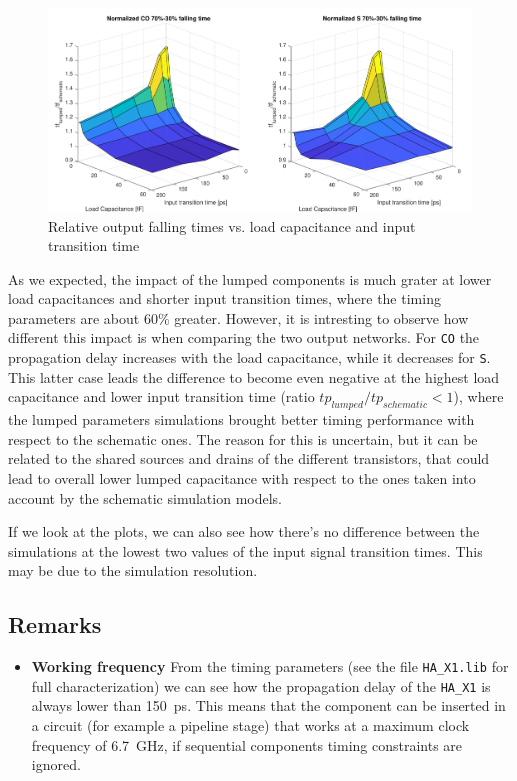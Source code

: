 \documentclass[a4paper]{article}
\newcommand{\ha}{\texttt{HA\_X1}\xspace}
\begin{document}
\begin{figure}[ht]
	\includegraphics[width=\linewidth]{Images/HA/t_F_diff_crop.pdf}
	\caption{Relative output falling times vs. load capacitance and input transition time}
	\label{fig:HA_t_F_diff}
\end{figure}

As we expected, the impact of the lumped components is much grater at lower load capacitances and shorter input transition times, where the timing parameters are about 60\% greater. However, it is intresting to observe how different this impact is when comparing the two output networks. For \texttt{CO} the propagation delay increases with the load capacitance, while it decreases for \texttt{S}. This latter case leads the difference to become even negative at the highest load capacitance and lower input transition time (ratio $tp_{lumped}/tp_{schematic} < 1$), where the lumped parameters simulations brought better timing performance with respect to the schematic ones. The reason for this is uncertain, but it can be related to the shared sources and drains of the different transistors, that could lead to overall lower lumped capacitance with respect to the ones taken into account by the schematic simulation models.

If we look at the plots, we can also see how there's no difference between the simulations at the lowest two values of the input signal transition times. This may be due to the simulation resolution.

\subsection{Remarks}

\begin{itemize}
	\item \textbf{Working frequency} From the timing parameters (see the file \texttt{HA\_X1.lib} for full characterization) we can see how the propagation delay of the \ha is always lower than \SI{150}{\pico\second}. This means that the component can be inserted in a circuit (for example a pipeline stage) that works at a maximum clock frequency of \SI{6.7}{\giga\hertz}, if sequential components timing constraints are ignored.
\end{itemize}
\end{document}
